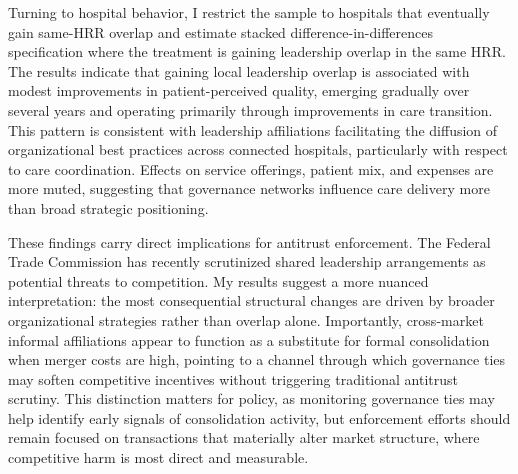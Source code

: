 \documentclass[12pt]{article}
\begin{document}
Turning to hospital behavior, I restrict the sample to hospitals that eventually gain same-HRR overlap and estimate stacked difference-in-differences specification where the treatment is gaining leadership overlap in the same HRR. The results indicate that gaining local leadership overlap is associated with modest improvements in patient-perceived quality, emerging gradually over several years and operating primarily through improvements in care transition. This pattern is consistent with leadership affiliations facilitating the diffusion of organizational best practices across connected hospitals, particularly with respect to care coordination. Effects on service offerings, patient mix, and expenses are more muted, suggesting that governance networks influence care delivery more than broad strategic positioning.

These findings carry direct implications for antitrust enforcement. The Federal Trade Commission has recently scrutinized shared leadership arrangements as potential threats to competition. My results suggest a more nuanced interpretation: the most consequential structural changes are driven by broader organizational strategies rather than overlap alone. Importantly, cross-market informal affiliations appear to function as a substitute for formal consolidation when merger costs are high, pointing to a channel through which governance ties may soften competitive incentives without triggering traditional antitrust scrutiny. This distinction matters for policy, as monitoring governance ties may help identify early signals of consolidation activity, but enforcement efforts should remain focused on transactions that materially alter market structure, where competitive harm is most direct and measurable.
    \newpage


    \printbibliography


    



    

    

	
	
	
\end{document}
